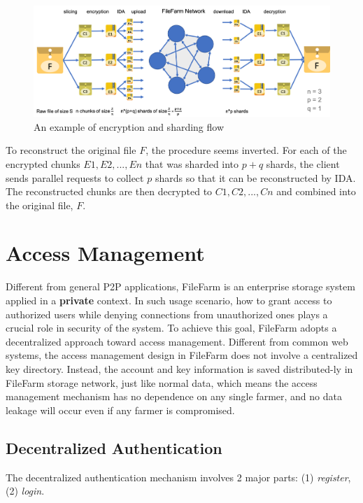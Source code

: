\begin{figure}[!b]
  \centering
    \includegraphics[width=15cm]{figures/data_confidentiality.png}
    \caption{An example of encryption and sharding flow}
    \label{fig:dataconfidentiality}
\end{figure}

To reconstruct the original file $F$, the procedure seems inverted. For each of the encrypted chunks $E1, E2, ..., En$ that was sharded into $p+q$ shards, the client sends parallel requests to collect $p$ shards so that it can be reconstructed by IDA. The reconstructed chunks are then decrypted to $C1, C2, ..., Cn$ and combined into the original file, $F$.

\section{Access Management}
\label{s:accessmanagement}

Different from general P2P applications, FileFarm is an enterprise storage system applied in a \textbf{private} context. In such usage scenario, how to grant access to authorized users while denying connections from unauthorized ones plays a crucial role in security of the system. To achieve this goal, FileFarm adopts a decentralized approach toward access management. Different from common web systems, the access management design in FileFarm does not involve a centralized key directory. Instead, the account and key information is saved distributed-ly in FileFarm storage network, just like normal data, which means the access management mechanism has no dependence on any single farmer, and no data leakage will occur even if any farmer is compromised.

\subsection{Decentralized Authentication}
\label{ss:decentralizedauthentication}

The decentralized authentication mechanism involves 2 major parts: (1) \textit{register}, (2) \textit{login}.

